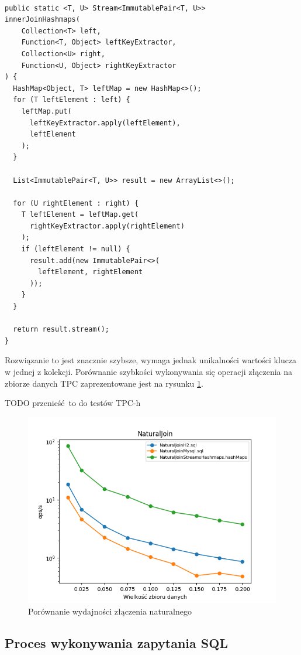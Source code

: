 \documentclass[12pt,twoside,openright]{extarticle}
\begin{document}
\begin{lstlisting}[label=join3, caption=Rozwiązanie nr 3]

public static <T, U> Stream<ImmutablePair<T, U>> 
innerJoinHashmaps(
    Collection<T> left,
    Function<T, Object> leftKeyExtractor,
    Collection<U> right,
    Function<U, Object> rightKeyExtractor
) {
  HashMap<Object, T> leftMap = new HashMap<>();
  for (T leftElement : left) {
    leftMap.put(
      leftKeyExtractor.apply(leftElement),
      leftElement
    );
  }
  
  List<ImmutablePair<T, U>> result = new ArrayList<>();
  
  for (U rightElement : right) {
    T leftElement = leftMap.get(
      rightKeyExtractor.apply(rightElement)
    );
    if (leftElement != null) {
      result.add(new ImmutablePair<>(
        leftElement, rightElement
      ));
    }
  }
  
  return result.stream();
}
\end{lstlisting}

Rozwiązanie to jest znacznie szybsze, wymaga jednak unikalności wartości klucza w jednej z kolekcji. Porównanie szybkości wykonywania się operacji złączenia na zbiorze danych TPC zaprezentowane jest na rysunku \ref{fig:naturaljoin}.

TODO przenieść to do testów TPC-h
\begin{figure}[H]
    \centering
    \includegraphics[width=13cm]{plots/NaturalJoin}
    \caption{Porównanie wydajności złączenia naturalnego}
    \label{fig:naturaljoin}
\end{figure}


\subsection{Proces wykonywania zapytania SQL}
\end{document}
